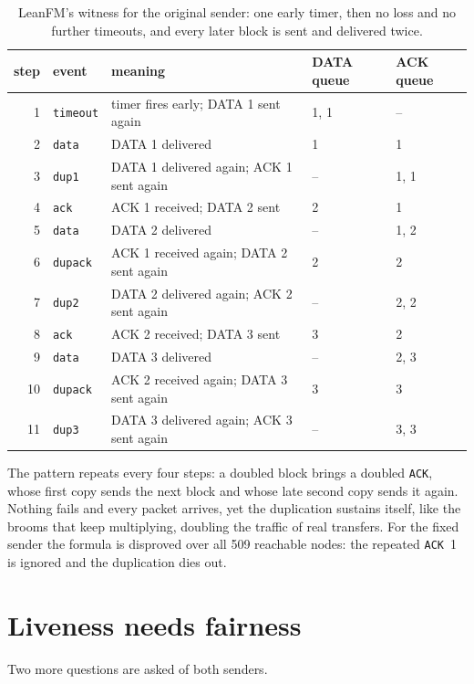 \begin{table}[ht]
\centering
\small
\begin{tabular}{@{}rlp{}ll@{}}
\toprule
step & event & meaning & DATA queue & ACK queue \\
\midrule
1 & \texttt{timeout} & timer fires early; DATA 1 sent again & 1, 1 & -- \\
2 & \texttt{data} & DATA 1 delivered & 1 & 1 \\
3 & \texttt{dup1} & DATA 1 delivered again; ACK 1 sent again & -- & 1, 1 \\
4 & \texttt{ack} & ACK 1 received; DATA 2 sent & 2 & 1 \\
5 & \texttt{data} & DATA 2 delivered & -- & 1, 2 \\
6 & \texttt{dupack} & ACK 1 received again; DATA 2 sent again & 2 & 2 \\
7 & \texttt{dup2} & DATA 2 delivered again; ACK 2 sent again & -- & 2, 2 \\
8 & \texttt{ack} & ACK 2 received; DATA 3 sent & 3 & 2 \\
9 & \texttt{data} & DATA 3 delivered & -- & 2, 3 \\
10 & \texttt{dupack} & ACK 2 received again; DATA 3 sent again & 3 & 3 \\
11 & \texttt{dup3} & DATA 3 delivered again; ACK 3 sent again & -- & 3, 3 \\
\bottomrule
\end{tabular}
\caption{LeanFM's witness for the original sender: one early timer, then no
loss and no further timeouts, and every later block is sent and delivered
twice.}
\label{tab:tftp-witness}
\end{table}

The pattern repeats every four steps: a doubled block brings a doubled
\texttt{ACK}, whose first copy sends the next block and whose late second copy sends
it again. Nothing fails and every packet arrives, yet the duplication sustains
itself, like the brooms that keep multiplying, doubling the traffic of real
transfers. For the fixed sender the formula is disproved over all 509 reachable
nodes: the repeated \texttt{ACK}~1 is ignored and the duplication dies out.

\section{Liveness needs fairness}

Two more questions are asked of both senders.

